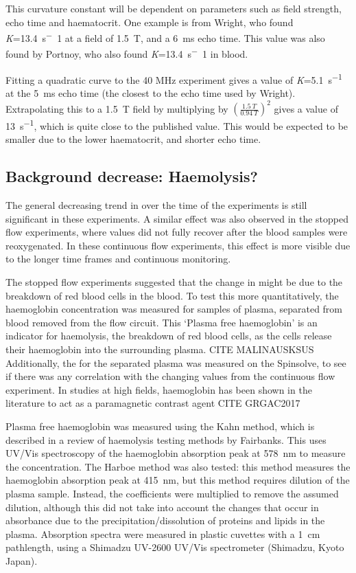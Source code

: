 This curvature constant will be dependent on parameters such as field strength, echo time and haematocrit.
One example is from Wright, who found \textit{K}=\SI{13.4}{s^-1} at a field of \SI{1.5}{T}, and a \SI{6}{ms} echo time\cite{WrightEstimatingoxygensaturation1991}.
This value was also found by Portnoy, who also found \textit{K}=\SI{13.4}{s^-1} in blood\cite{PortnoyRelaxationpropertieshuman2017}.

Fitting a quadratic curve to the 40 MHz experiment gives a value of \textit{K}=\SI{5.1}{s^{-1}} at the \SI{5}{ms} echo time (the closest to the echo time used by Wright).
Extrapolating this to a \SI{1.5}{T} field by multiplying by $(\frac{\SI{1.5}{T}}{\SI{0.94}{T}})^2$ gives a value of \SI{13}{s^{-1}}, which is quite close to the published value.
This would be expected to be smaller due to the lower haematocrit, and shorter echo time.


\subsection{Background \Ttwo decrease: Haemolysis?}

The general decreasing trend in \Ttwo over the time of the experiments is still significant in these experiments.
A similar effect was also observed in the stopped flow experiments, where \Ttwo values did not fully recover after the blood samples were reoxygenated.
In these continuous flow experiments, this effect is more visible due to the longer time frames and continuous monitoring.

The stopped flow experiments suggested that the change in \Ttwo might be due to the breakdown of red blood cells in the blood.
To test this more quantitatively, the haemoglobin concentration was measured for samples of plasma, separated from blood removed from the flow circuit.
This `Plasma free haemoglobin' is an indicator for haemolysis, the breakdown of red blood cells, as the cells release their haemoglobin into the surrounding plasma. CITE MALINAUSKSUS
Additionally, the \Ttwo for the separated plasma was measured on the Spinsolve, to see if there was any correlation with the changing \Ttwo values from the continuous flow experiment.
In studies at high fields, haemoglobin has been shown in the literature to act as a paramagnetic contrast agent CITE GRGAC2017

Plasma free haemoglobin was measured using the Kahn method, which is described in a review of haemolysis testing methods by Fairbanks\cite{FairbanksMethodsmeasuringplasma1992}.
This uses UV/Vis spectroscopy of the haemoglobin absorption peak at \SI{578}{nm} to measure the concentration.
The Harboe method was also tested: this method measures the haemoglobin absorption peak at \SI{415}{nm}, but this method requires dilution of the plasma sample.
Instead, the coefficients were multiplied to remove the assumed dilution, although this did not take into account the changes that occur in absorbance due to the precipitation/dissolution of proteins and lipids in the plasma.
Absorption spectra were measured in plastic cuvettes with a \SI{1}{cm} pathlength, using a Shimadzu UV-2600 UV/Vis spectrometer (Shimadzu, Kyoto Japan).

